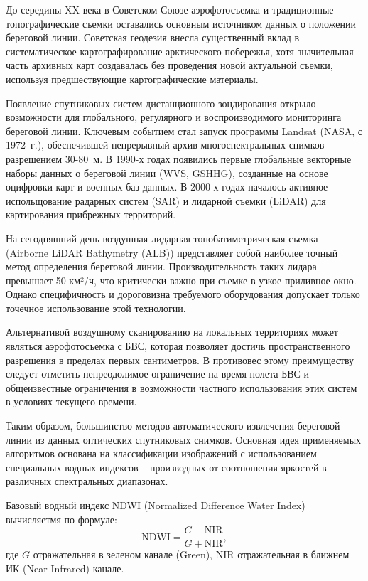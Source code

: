 До середины XX века в Советском Союзе аэрофотосъемка и традиционные топографические съемки оставались основным источником данных о положении береговой линии.
Советская геодезия внесла существенный вклад в систематическое картографирование арктического побережья, хотя значительная часть архивных карт создавалась без проведения новой актуальной съемки, используя предшествующие картографические материалы.

Появление спутниковых систем дистанционного зондирования открыло возможности для глобального, регулярного и воспроизводимого мониторинга береговой линии. 
Ключевым событием стал запуск программы Landsat (NASA, с 1972~г.), обеспечившей непрерывный архив многоспектральных снимков разрешением 30-80~м. 
В 1990-х годах появились первые глобальные векторные наборы данных о береговой линии (WVS, GSHHG), созданные на основе оцифровки карт и военных баз данных. 
В 2000-х годах началось активное испольщование радарных систем (SAR) и лидарной съемки (LiDAR) для картирования прибрежных территорий.

На сегодняшний день воздушная лидарная топобатиметрическая съемка (Airborne LiDAR Bathymetry (ALB)) представляет собой наиболее точный метод определения береговой линии. 
Производительность таких лидара превышает 50 км²/ч, что критически важно при съемке в узкое приливное окно. 
Однако специфичность и дороговизна требуемого оборудования допускает только точечное использование этой технологии.

Альтернативой воздушному сканированию на локальных территориях может являться аэрофотосъемка с БВС, которая позволяет достичь пространственного разрешения в пределах первых сантиметров.
В противовес этому преимуществу следует отметить непреодолимое ограничение на время полета БВС и общеизвестные ограничения в возможности частного использования этих систем в условиях текущего времени.

Таким образом, большинство методов автоматического извлечения береговой линии из данных оптических спутниковых снимков.
Основная идея применяемых алгоритмов основана на классификации изображений с использованием специальных водных индексов -- производных от соотношения яркостей в различных спектральных диапазонах.

Базовый водный индекс NDWI (Normalized Difference Water Index)~\cite{McFeeters1996NDWI} вычисляетмя по формуле: 
\begin{equation}\label{eq:ndwi}
    \text{NDWI} = \frac{G - \text{NIR}}{G + \text{NIR}},
\end{equation}
где $G$ отражательная в зеленом канале (Green), $\text{NIR}$ отражательная в ближнем ИК (Near Infrared) канале.


